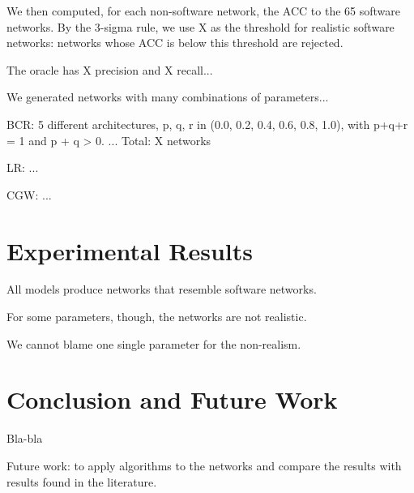 We then computed, for each non-software network, the ACC to the 65 software
networks. By the 3-sigma rule, we use X as the threshold for realistic software
networks: networks whose ACC is below this threshold are rejected.

The oracle has X precision and X recall...


We generated networks with many combinations of parameters...

BCR: 5 different architectures, 
p, q, r in (0.0, 0.2, 0.4, 0.6, 0.8, 1.0), with p+q+r = 1 and p + q > 0.
...
Total: X networks

LR: ...

CGW: ...

\section{Experimental Results}

All models produce networks that resemble software networks.

For some parameters, though, the networks are not realistic.

We cannot blame one single parameter for the non-realism.

\section{Conclusion and Future Work}

Bla-bla

Future work: to apply algorithms to the networks and compare the results with
results found in the literature.

